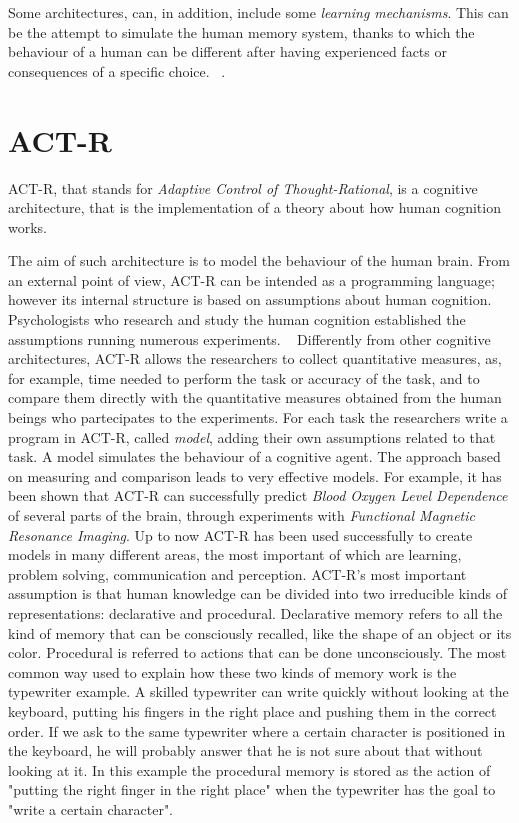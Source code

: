 	Some architectures, can, in addition, include some \emph{learning mechanisms}. This can be the attempt to simulate the human memory system, thanks to which the behaviour of a human can be different after having experienced facts or consequences of a specific choice. ~\cite{SoarCogArch2012}.
	
	
  \section{ACT-R}
	\mbox{ACT-R}, that stands for \emph{Adaptive Control of Thought-Rational}, is a cognitive architecture, that is the implementation of a theory about how human cognition works.
	
	The aim of such architecture is to model the behaviour of the human brain. From an external point of view, \mbox{ACT-R} can be intended as a programming language; however its internal structure is based on assumptions about human cognition. Psychologists who research and study the human cognition established the assumptions running numerous experiments.  ~\cite{Allen94}
	Differently from other cognitive architectures, \mbox{ACT-R} allows the researchers to collect quantitative measures, as, for example, time needed to perform the task or accuracy of the task, and to compare them directly with the quantitative measures obtained from the human beings who partecipates to the experiments. For each task the researchers write a program in \mbox{ACT-R}, called \emph{model}, adding their own assumptions related to that task. 
	A model simulates the behaviour of a cognitive agent. The approach based on measuring and comparison leads to very effective models. For example, it has been shown that \mbox{ACT-R} can successfully predict \emph{Blood Oxygen Level Dependence} of several parts of the brain, through experiments with \emph{Functional Magnetic Resonance Imaging}.
	Up to now \mbox{ACT-R} has been used successfully to create models in many different areas, the most important of which are learning, problem solving, communication and perception.
\newline
	\mbox{ACT-R's} most important assumption is that human knowledge can be divided into two irreducible kinds of representations: declarative and procedural.
	Declarative memory refers to all the kind of memory that can be consciously recalled, like the shape of an object or its color. Procedural is referred to actions that can be done unconsciously. The most common way used to explain how these two kinds of memory work is the typewriter example. 
	A skilled typewriter can write quickly without looking at the keyboard, putting his fingers in the right place and pushing them in the correct order. If we ask to the same typewriter where a certain character is positioned in the keyboard, he will probably answer that he is not sure about that without looking at it. In this example the procedural memory is stored as the action of "putting the right finger in the right place" when the typewriter has the goal to "write a certain character". 

